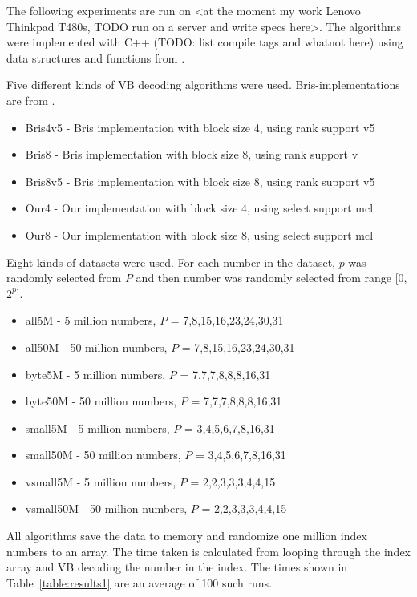 The following experiments are run on <at the moment my work Lenovo Thinkpad T480s, TODO run on a server and write specs here>. The algorithms 
were implemented with C++ (TODO: list compile tags and whatnot here) using data structures and functions from \citep{gbmp2014sea}. 



Five different kinds of VB decoding algorithms were used. Bris-implementations are from \citep{Bri09}. 
\begin{itemize}
  \item Bris4v5 - Bris implementation with block size 4, using rank support v5
  \item Bris8 - Bris implementation with block size 8, using rank support v
  \item Bris8v5 - Bris implementation with block size 8, using rank support v5
  \item Our4 - Our implementation with block size 4, using select support mcl
  \item Our8 - Our implementation with block size 8, using select support mcl
\end{itemize}

Eight kinds of datasets were used. For each number in the dataset, $p$ was randomly selected from $P$ and then number was randomly selected from
range [0,$2^p$].

\begin{itemize}
  \item all5M - 5 million numbers, $P$ = {7,8,15,16,23,24,30,31}
  \item all50M - 50 million numbers, $P$ = {7,8,15,16,23,24,30,31}
  \item byte5M - 5 million numbers, $P$ = {7,7,7,8,8,8,16,31}
  \item byte50M - 50 million numbers, $P$ = {7,7,7,8,8,8,16,31}
  \item small5M - 5 million numbers, $P$ = {3,4,5,6,7,8,16,31}
  \item small50M - 50 million numbers, $P$ = {3,4,5,6,7,8,16,31}
  \item vsmall5M - 5 million numbers, $P$ = {2,2,3,3,3,4,4,15}
  \item vsmall50M - 50 million numbers, $P$ = {2,2,3,3,3,4,4,15}
\end{itemize}

All algorithms save the data to memory and randomize one million index numbers to an array. The time taken is calculated from looping through the 
index array and VB decoding the number in the index. The times shown in Table~\ref{table:results1} are an average of 100 such runs.

